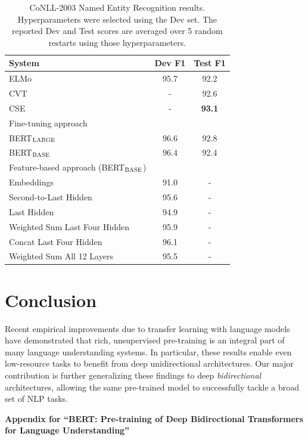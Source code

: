 \documentclass[11pt,a4paper]{article}
\newcommand\bertbase{BERT$_{\small \textsc{BASE}}$\xspace}
\newcommand\bertlarge{BERT$_{\small \textsc{LARGE}}$\xspace}
\begin{document}
\begin{table}[t]
\small
\centering
 \begin{tabular}{@{}lcc@{}}
\toprule
System & Dev F1 & Test F1 \\
\midrule
ELMo~\cite{peters-etal:2018:_deep}& 95.7 & 92.2 \\
CVT~\cite{clark2018semi} & - & 92.6 \\
CSE~\cite{akbik2018contextual} & - & {\bf 93.1} \\
\midrule
Fine-tuning approach & & \\
\;\;\;\bertlarge  & 96.6 & 92.8 \\
\;\;\;\bertbase& 96.4 & 92.4 \\
\midrule
Feature-based approach (\bertbase) &  &  \\
\;\;\;Embeddings & 91.0 &- \\
\;\;\;Second-to-Last Hidden   & 95.6&- \\
\;\;\;Last Hidden            & 94.9&- \\
\;\;\;Weighted Sum Last Four Hidden        & 95.9&- \\
\;\;\;Concat Last Four Hidden        & 96.1&- \\
\;\;\;Weighted Sum All 12 Layers        & 95.5&- \\
\bottomrule
\end{tabular}
\caption{CoNLL-2003 Named Entity Recognition results. Hyperparameters were selected using the Dev set. The reported Dev and Test scores are averaged over 5 random restarts using those hyperparameters.
}
\label{tab:ner_results}    
\label{tab:pretrained_embeddings}    
\end{table}

\section{Conclusion}
Recent empirical improvements due to transfer learning with language models have demonstrated that rich, unsupervised pre-training is an integral part of many language understanding systems. In particular, these results enable even low-resource tasks to benefit from deep unidirectional architectures. Our major contribution is further generalizing these findings to deep \emph{bidirectional} architectures, allowing the same pre-trained model to successfully tackle a broad set of NLP tasks.





{} 
\appendix                                     
\begin{center}
{\bf \large{
    Appendix for ``BERT: Pre-training of Deep Bidirectional Transformers for Language Understanding''}}
\end{center}
\end{document}
